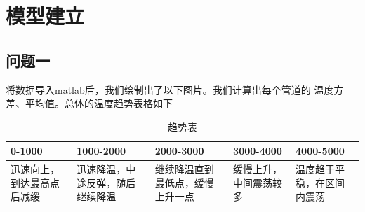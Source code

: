 \section{模型建立}    
    \subsection{问题一}
        将数据导入matlab后，我们绘制出了以下图片。我们计算出每个管道的
        温度方差、平均值。总体的温度趋势表格如下
        \begin{table}[H]
            \centering
            \begin{tabular}{ p{2.5cm}|p{2.5cm}|p{2.5cm}|p{2.5cm}|p{2.5cm}  }
                \hline
                0-1000&1000-2000&2000-3000&3000-4000&4000-5000\\
                \hline
                迅速向上，到达最高点后减缓&
                迅速降温，中途反弹，随后继续降温&
                继续降温直到最低点，缓慢上升一点&
                缓慢上升，中间震荡较多&
                温度趋于平稳，在区间内震荡\\
                \hline
            \end{tabular}
            \caption{趋势表}
        \end{table}

